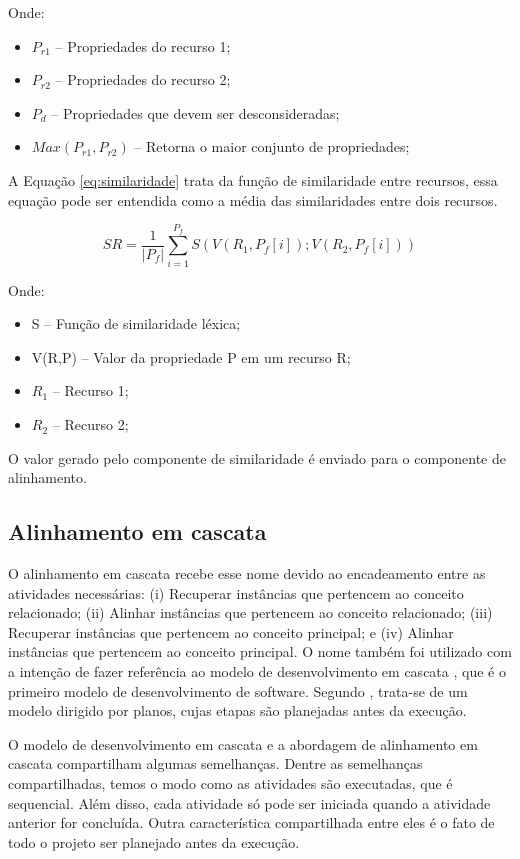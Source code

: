 Onde:
\begin{itemize}
	\item $P_{r1}$ – Propriedades do recurso 1;
	\item $P_{r2}$ –  Propriedades do recurso 2;
	\item $P_d$ –  Propriedades que devem ser desconsideradas;
	\item $M a x  ( P_{r1} ,P_{r2} )$ – Retorna o maior conjunto de propriedades;
\end{itemize}

A Equação \ref{eq:similaridade} trata da função de similaridade entre recursos, essa equação pode ser entendida como a média das similaridades entre dois recursos.

\begin{equation}
SR  = \frac{1}{|P_f|} { \sum_{i = 1}^{P_f} {S(V(R_1,P_f[i]);V(R_2,P_f[i]))}}
\label{eq:similaridade}
\end{equation}

Onde:

\begin{itemize}
	\item S – Função de similaridade léxica;
	\item V(R,P) – Valor da propriedade P em um recurso R;
	\item $R_1$ – Recurso 1;
	\item $R_2$ – Recurso 2;
\end{itemize}

O valor gerado pelo componente de similaridade é enviado para o componente de alinhamento.

\subsection{Alinhamento em cascata}
\label{sub:cascata}
O alinhamento em cascata recebe esse nome devido ao encadeamento entre as atividades necessárias: (i) Recuperar instâncias que pertencem ao conceito relacionado; (ii) Alinhar instâncias que pertencem ao conceito relacionado; (iii) Recuperar instâncias que pertencem ao conceito principal; e (iv) Alinhar instâncias que pertencem ao conceito principal. O nome também foi utilizado com a intenção de fazer referência ao modelo de desenvolvimento em cascata \cite{royce1970managing}, que é o primeiro modelo de desenvolvimento de software. Segundo , trata-se de um modelo dirigido por planos, cujas etapas são planejadas antes da execução. 

O modelo de desenvolvimento em cascata e a abordagem de alinhamento em cascata compartilham algumas semelhanças. Dentre as semelhanças compartilhadas, temos o modo como as atividades são executadas, que é sequencial. Além disso, cada atividade só pode ser iniciada quando a atividade anterior for concluída. Outra característica compartilhada entre eles é o fato de todo o projeto ser planejado antes da execução. 

